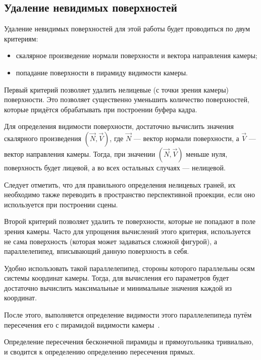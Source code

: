 \subsection{Удаление невидимых поверхностей}

Удаление невидимых поверхностей для этой работы будет проводиться по двум критериям:

\begin{itemize}
    \item скалярное произведение нормали поверхности и вектора направления камеры;
    \item попадание поверхности в пирамиду видимости камеры.
\end{itemize}

Первый критерий позволяет удалить нелицевые (с точки зрения камеры) поверхности. Это позволяет существенно уменьшить количество поверхностей, которые придётся обрабатывать при построении буфера кадра.

Для определения видимости поверхности, достаточно вычислить значения скалярного произведения $(\vec{N}, \vec{V})$, где $\vec{N}$ --- вектор нормали поверхности, а $\vec{V}$ --- вектор направления камеры. Тогда, при значении $(\vec{N}, \vec{V})$ меньше нуля, поверхность будет лицевой, а во всех остальных случаях --- нелицевой.

Следует отметить, что для правильного определения нелицевых граней, их необходимо также переводить в пространство перспективной проекции, если оно используется при построении сцены.

Второй критерий позволяет удалить те поверхности, которые не попадают в поле зрения камеры. Часто для упрощения вычислений этого критерия, используется не сама поверхность (которая может задаваться сложной фигурой), а параллелепипед, вписывающий данную поверхность в себя.

Удобно использовать такой параллелепипед, стороны которого параллельны осям системы координат камеры. Тогда, для вычисления его параметров будет достаточно вычислить максимальные и минимальные значения каждой из координат.

После этого, выполняется определение видимости этого параллелепипеда путём пересечения его с пирамидой видимости камеры~\cite{Rogers}.

Определение пересечения бесконечной пирамиды и прямоугольника тривиально, и сводится к определению определению пересечения прямых.